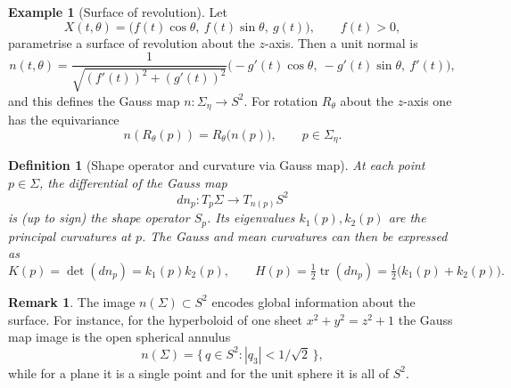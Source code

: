 \documentclass[12pt,a4paper]{article}
\theoremstyle{plain}
\newtheorem{definition}{Definition}
\theoremstyle{definition}      %
\newtheorem{example}[theorem]{Example}
\newtheorem{remark}[theorem]{Remark}
\begin{document}
\begin{example}[Surface of revolution]
	Let
	\[
	X(t,\theta)=\bigl(f(t)\cos\theta,\ f(t)\sin\theta,\ g(t)\bigr),
	\qquad f(t)>0,
	\]
	parametrise a surface of revolution about the $z$-axis. Then a unit
	normal is
	\[
	n(t,\theta)
	= \frac{1}{\sqrt{(f'(t))^2+(g'(t))^2}}
	\bigl(-g'(t)\cos\theta,\ -g'(t)\sin\theta,\ f'(t)\bigr),
	\]
	and this defines the Gauss map $n:\Sigma_\eta\to S^2$. For rotation
	$R_\theta$ about the $z$-axis one has the equivariance
	\[
	n(R_\theta(p)) = R_\theta\bigl(n(p)\bigr),\qquad p\in\Sigma_\eta.
	\]
\end{example}

\begin{definition}[Shape operator and curvature via Gauss map]
	At each point $p\in\Sigma$, the differential of the Gauss map
	\[
	d n_p : T_p\Sigma \longrightarrow T_{n(p)}S^2
	\]
	is (up to sign) the \emph{shape operator} $S_p$. Its eigenvalues
	$k_1(p),k_2(p)$ are the principal curvatures at $p$. The Gauss and mean
	curvatures can then be expressed as
	\[
	K(p) = \det(d n_p) = k_1(p)k_2(p), \qquad
	H(p) = \tfrac12 \operatorname{tr}(d n_p) = \tfrac12\bigl(k_1(p)+k_2(p)\bigr).
	\]
\end{definition}

\begin{remark}
	The image $n(\Sigma)\subset S^2$ encodes global information about the
	surface. For instance, for the hyperboloid of one sheet $x^2+y^2=z^2+1$
	the Gauss map image is the open spherical annulus
	\[
	n(\Sigma) = \{\,q\in S^2 : |q_3|<1/\sqrt{2}\,\},
	\]
	while for a plane it is a single point and for the unit sphere it is
	all of $S^2$.
\end{remark}
\end{document}
